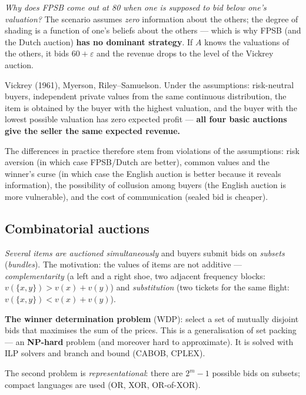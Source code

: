 \documentclass[11pt,a4paper]{article}
\theoremstyle{definition}
\begin{document}
\emph{Why does FPSB come out at 80 when one is supposed to bid below one's valuation?} The
scenario assumes \emph{zero} information about the others; the degree of shading is a function
of one's beliefs about the others --- which is why FPSB (and the Dutch auction) \textbf{has no
dominant strategy}. If $A$ knows the valuations of the others, it bids $60+\varepsilon$ and the
revenue drops to the level of the Vickrey auction.

\begin{defbox}
Vickrey (1961), Myerson, Riley--Samuelson. Under the assumptions: risk-neutral buyers,
independent private values from the same continuous distribution, the item is obtained by the buyer
with the highest valuation, and the buyer with the lowest possible valuation has zero expected
profit --- \textbf{all four basic auctions give the seller the same expected revenue.}

The differences in practice therefore stem from violations of the assumptions: risk aversion (in which
case FPSB/Dutch are better), common values and the winner's curse (in which case the English auction is
better because it reveals information), the possibility of collusion among buyers (the English auction
is more vulnerable), and the cost of communication (sealed bid is cheaper).
\end{defbox}
\subsection{Combinatorial auctions}

\begin{defbox}
\emph{Several items are auctioned simultaneously} and buyers submit bids on \emph{subsets}
(\emph{bundles}). The motivation: the values of items are not additive ---
\emph{complementarity} (a left and a right shoe, two adjacent frequency blocks:
$v(\{x,y\}) > v(x)+v(y)$) and \emph{substitution} (two tickets for the same flight:
$v(\{x,y\}) < v(x)+v(y)$).

\textbf{The winner determination problem} (WDP): select a set of mutually disjoint bids that maximises
the sum of the prices. This is a generalisation of set packing --- an \textbf{NP-hard}
problem (and moreover hard to approximate). It is solved with ILP solvers and branch and bound
(CABOB, CPLEX).

The second problem is \emph{representational}: there are $2^m - 1$ possible bids on subsets;
compact languages are used (OR, XOR, OR-of-XOR).
\end{defbox}
\end{document}
